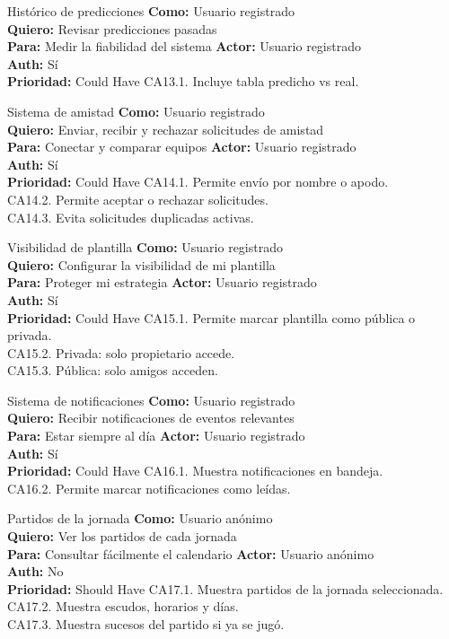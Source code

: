 {Histórico de predicciones}
{\textbf{Como:} Usuario registrado\\ \textbf{Quiero:} Revisar predicciones pasadas\\ \textbf{Para:} Medir la fiabilidad del sistema}
{\textbf{Actor:} Usuario registrado\\ \textbf{Auth:} Sí\\ \textbf{Prioridad:} Could Have}
{CA13.1. Incluye tabla predicho vs real.\\}

{Sistema de amistad}
{\textbf{Como:} Usuario registrado\\ \textbf{Quiero:} Enviar, recibir y rechazar solicitudes de amistad\\ \textbf{Para:} Conectar y comparar equipos}
{\textbf{Actor:} Usuario registrado\\ \textbf{Auth:} Sí\\ \textbf{Prioridad:} Could Have}
{CA14.1. Permite envío por nombre o apodo.\\ CA14.2. Permite aceptar o rechazar solicitudes.\\ CA14.3. Evita solicitudes duplicadas activas.}

{Visibilidad de plantilla}
{\textbf{Como:} Usuario registrado\\ \textbf{Quiero:} Configurar la visibilidad de mi plantilla\\ \textbf{Para:} Proteger mi estrategia}
{\textbf{Actor:} Usuario registrado\\ \textbf{Auth:} Sí\\ \textbf{Prioridad:} Could Have}
{CA15.1. Permite marcar plantilla como pública o privada.\\ CA15.2. Privada: solo propietario accede.\\ CA15.3. Pública: solo amigos acceden.}

{Sistema de notificaciones}
{\textbf{Como:} Usuario registrado\\ \textbf{Quiero:} Recibir notificaciones de eventos relevantes\\ \textbf{Para:} Estar siempre al día}
{\textbf{Actor:} Usuario registrado\\ \textbf{Auth:} Sí\\ \textbf{Prioridad:} Could Have}
{CA16.1. Muestra notificaciones en bandeja.\\ CA16.2. Permite marcar notificaciones como leídas.}

{Partidos de la jornada}
{\textbf{Como:} Usuario anónimo\\ \textbf{Quiero:} Ver los partidos de cada jornada\\ \textbf{Para:} Consultar fácilmente el calendario}
{\textbf{Actor:} Usuario anónimo\\ \textbf{Auth:} No\\ \textbf{Prioridad:} Should Have}
{CA17.1. Muestra partidos de la jornada seleccionada.\\ CA17.2. Muestra escudos, horarios y días.\\ CA17.3. Muestra sucesos del partido si ya se jugó.}


